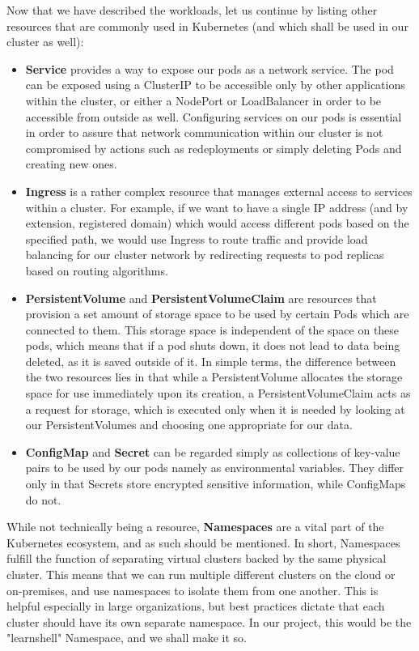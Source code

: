 \documentclass[thesis=B,english]{FITthesis}[2019/12/23]
\begin{document}
Now that we have described the workloads, let us continue by listing other resources that are commonly used in Kubernetes (and which shall be used in our cluster as well):

\begin{itemize}
  \setlength\itemsep{0em}
  \item \textbf{Service} provides a way to expose our pods as a network service. The pod can be exposed using a ClusterIP to be accessible only by other applications within the cluster, or either a NodePort or LoadBalancer in order to be accessible from outside as well. Configuring services on our pods is essential in order to assure that network communication within our cluster is not compromised by actions such as redeployments or simply deleting Pods and creating new ones.
  \item \textbf{Ingress} is a rather complex resource that manages external access to services within a cluster. For example, if we want to have a single IP address (and by extension, registered domain) which would access different pods based on the specified path, we would use Ingress to route traffic and provide load balancing for our cluster network by redirecting requests to pod replicas based on routing algorithms.
  \item \textbf{PersistentVolume} and \textbf{PersistentVolumeClaim} are resources that provision a set amount of storage space to be used by certain Pods which are connected to them. This storage space is independent of the space on these pods, which means that if a pod shuts down, it does not lead to data being deleted, as it is saved outside of it. In simple terms, the difference between the two resources lies in that while a PersistentVolume allocates the storage space for use immediately upon its creation, a PersistentVolumeClaim acts as a request for storage, which is executed only when it is needed by looking at our PersistentVolumes and choosing one appropriate for our data. 
  \item \textbf{ConfigMap} and \textbf{Secret} can be regarded simply as collections of key-value pairs to be used by our pods namely as environmental variables. They differ only in that Secrets store encrypted sensitive information, while ConfigMaps do not.
\end{itemize}

While not technically being a resource, \textbf{Namespaces} are a vital part of the Kubernetes ecosystem, and as such should be mentioned. In short, Namespaces fulfill the function of separating virtual clusters backed by the same physical cluster. This means that we can run multiple different clusters on the cloud or on-premises, and use namespaces to isolate them from one another. This is helpful especially in large organizations, but best practices dictate that each cluster should have its own separate namespace. In our project, this would be the "learnshell" Namespace, and we shall make it so.
\end{document}
